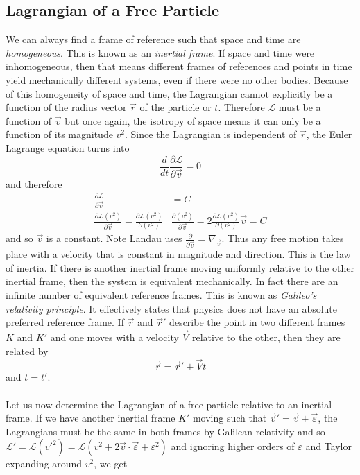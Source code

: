 \documentclass{article}
\newcommand{\pd}[2]{\frac{\partial #1}{\partial #2}}
\newcommand{\od}[2]{\frac{d #1}{d #2}}
\newcommand{\lagr}{\mathscr{L}}
\theoremstyle{definition}
\theoremstyle{remark}
\begin{document}
\subsection{Lagrangian of a Free Particle}
We can always find a frame of reference such that space and time are \emph{homogeneous}. This is known as an \emph{inertial frame}. If space and time were inhomogeneous, then that means different frames of references and points in time yield mechanically different systems, even if there were no other bodies. Because of this homogeneity of space and time, the Lagrangian cannot explicitly be a function of the radius vector $\vec{r}$ of the particle or $t$. Therefore $\lagr$ must be a function of $\vec v$ but once again, the isotropy of space means it can only be a function of its magnitude $v^2$. Since the Lagrangian is independent of $\vec r$, the Euler Lagrange equation turns into 
\begin{equation*}
    \od{}{t} \pd{\lagr}{\vec v} =0
\end{equation*}
and therefore 
\begin{equation*}
    \begin{split}
        \pd{\lagr}{\vec v} &= C \\
        \pd{\lagr(v^2)}{\vec v} = \pd{\lagr(v^2)}{(v^2)}& \pd{(v^2)}{\vec v} = 2\pd{\lagr(v^2)}{(v^2)}\vec v =C
    \end{split}
\end{equation*}
and so $\vec{v}$ is a constant. Note Landau uses $\pd{}{\vec v} = \nabla_{\vec{v}}$. Thus any free motion takes place with a velocity that is constant in magnitude and direction. This is the law of inertia. If there is another inertial frame moving uniformly relative to the other inertial frame, then the system is equivalent mechanically. In fact there are an infinite number of equivalent reference frames. This is known as \emph{Galileo's relativity principle}. It effectively states that physics does not have an absolute preferred reference frame. If $\vec{r} $ and $\vec{r}'$ describe the point in two different frames $K$ and $K'$ and one moves with a velocity $\vec V$ relative to the other, then they are related by 
\begin{equation*}
    \vec r=\vec r'+\vec Vt
\end{equation*}
and $t=t'$. \\\\
Let us now determine the Lagrangian of a free particle relative to an inertial frame. If we have another inertial frame $K'$ moving such that $\vec v'=\vec v+\vec \varepsilon$, the Lagrangians must be the same in both frames by Galilean relativity and so $\lagr ' = \lagr(v'^2) =\lagr(v^2+2\vec v\cdot \vec \varepsilon + \varepsilon^2)$ and ignoring higher orders of $\varepsilon$ and Taylor expanding around $ v^2$, we get
\end{document}
